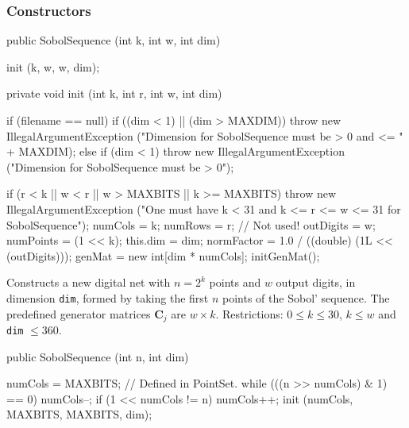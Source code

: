 \subsubsection* {Constructors}
\begin{code}

   public SobolSequence (int k, int w, int dim) \begin{hide} {
      init (k, w, w, dim);
   }

   private void init (int k, int r, int w, int dim) {
      if (filename == null)
         if ((dim < 1) || (dim > MAXDIM))
            throw new IllegalArgumentException 
               ("Dimension for SobolSequence must be > 0 and <= " + MAXDIM);
      else
         if (dim < 1)
            throw new IllegalArgumentException 
               ("Dimension for SobolSequence must be > 0");

      if (r < k || w < r || w > MAXBITS || k >= MAXBITS) 
         throw new IllegalArgumentException
            ("One must have k < 31 and k <= r <= w <= 31 for SobolSequence");
      numCols   = k;
      numRows   = r;   // Not used!
      outDigits = w;
      numPoints = (1 << k);
      this.dim  = dim;
      normFactor = 1.0 / ((double) (1L << (outDigits)));
      genMat = new int[dim * numCols];
      initGenMat();
   } 
\end{hide}
\end{code} 
\begin{tabb}
   Constructs a new digital net with $n = 2^k$ points and $w$ 
   output digits, in dimension \texttt{dim}, formed by taking the first
   $n$ points of the Sobol' sequence.
   The predefined generator matrices $\mathbf{C}_j$ are $w\times k$. %
   Restrictions: $0\le k\le 30$, $k\le w$ and \texttt{dim} $ \le 360$.
\end{tabb}
\begin{htmlonly}
\end{htmlonly}
\begin{code}

   public SobolSequence (int n, int dim) \begin{hide} {
      numCols = MAXBITS;      // Defined in PointSet.  
      while (((n >> numCols) & 1) == 0)
         numCols--;
      if (1 << numCols != n)
         numCols++;
      init (numCols, MAXBITS, MAXBITS, dim);
    }\end{hide}
\end{code} 
